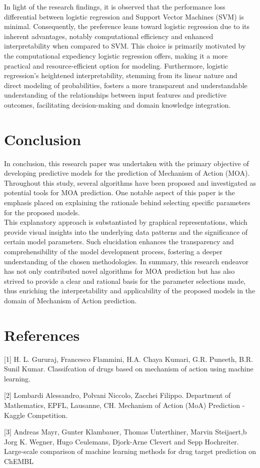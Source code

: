\documentclass{article}
\begin{document}
\begin{multicols}{2}
In light of the research findings, it is observed that the performance loss differential between logistic regression and Support Vector Machines (SVM) is minimal. Consequently, the preference leans toward logistic regression due to its inherent advantages, notably computational efficiency and enhanced interpretability when compared to SVM. This choice is primarily motivated by the computational expediency logistic regression offers, making it a more practical and resource-efficient option for modeling. Furthermore, logistic regression's heightened interpretability, stemming from its linear nature and direct modeling of probabilities, fosters a more transparent and understandable understanding of the relationships between input features and predictive outcomes, facilitating decision-making and domain knowledge integration.

\section{Conclusion}
In conclusion, this research paper was undertaken with the primary objective of developing predictive models for the prediction of Mechanism of Action (MOA). Throughout this study, several algorithms have been proposed and investigated as potential tools for MOA prediction. One notable aspect of this paper is the emphasis placed on explaining the rationale behind selecting specific parameters for the proposed models.\\
This explanatory approach is substantiated by graphical representations, which provide visual insights into the underlying data patterns and the significance of certain model parameters. Such elucidation enhances the transparency and comprehensibility of the model development process, fostering a deeper understanding of the chosen methodologies. In summary, this research endeavor has not only contributed novel algorithms for MOA prediction but has also strived to provide a clear and rational basis for the parameter selections made, thus enriching the interpretability and applicability of the proposed models in the domain of Mechanism of Action prediction. 

\section{References}
[1] H. L. Gururaj, Francesco Flammini, H.A. Chaya Kumari,
G.R. Puneeth, B.R. Sunil Kumar. Classifcation of drugs
based on mechanism of action using machine learning.

[2] Lombardi Alessandro, Polvani Niccolo, Zacchei Filippo.
Department of Mathematics, EPFL, Lausanne, CH.
Mechanism of Action (MoA) Prediction - Kaggle
Competition.

[3] Andreas Mayr, Gunter Klambauer, Thomas Unterthiner,
Marvin Steijaert,b Jorg K. Wegner, Hugo Ceulemans,
Djork-Arne Clevert and Sepp Hochreiter.
Large-scale comparison of machine learning methods for
drug target prediction on ChEMBL




\end{multicols}
\end{document}
